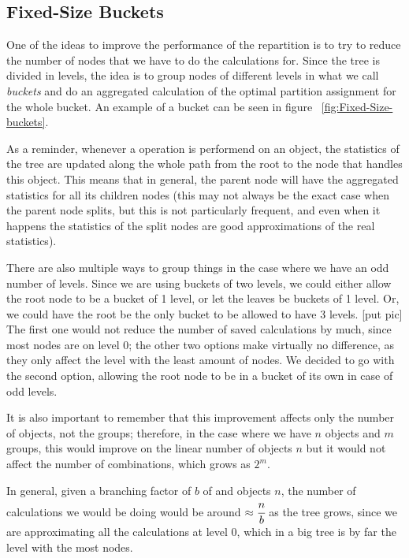 \subsection{Fixed-Size Buckets}\label{sec:Fixed-Size buckets}
One of the ideas to improve the performance of the repartition is to try to reduce the number of nodes that we have to do the calculations for. Since the tree is divided in levels, the idea is to group nodes of different levels in what we call \emph{buckets} and do an aggregated calculation of the optimal partition assignment for the whole bucket. An example of a bucket can be seen in figure ~\ref{fig:Fixed-Size-buckets}.

As a reminder, whenever a operation is performend on an object, the statistics of the tree are updated along the whole path from the root to the node that handles this object. This means that in general, the parent node will have the aggregated statistics for all its children nodes (this may not always be the exact case when the parent node splits, but this is not particularly frequent, and even when it happens the statistics of the split nodes are good approximations of the real statistics).

There are also multiple ways to group things in the case where we have an odd number of levels. Since we are using buckets of two levels, we could either allow the root node to be a bucket of 1 level, or let the leaves be buckets of 1 level. Or, we could have the root be the only bucket to be allowed to have 3 levels. [put pic] The first one would not reduce the number of saved calculations by much, since most nodes are on level 0; the other two options make virtually no difference, as they only affect the level with the least amount of nodes. We decided to go with the second option, allowing the root node to be in a bucket of its own in case of odd levels.

It is also important to remember that this improvement affects only the number of objects, not the groups; therefore, in the case where we have $n$ objects and $m$ groups, this would improve on the linear number of objects $n$ but it would not affect the number of combinations, which grows as $2^m$.

In general, given a branching factor of $b$ of and objects $n$, the number of calculations we would be doing would be around $\approx\cfrac{n}{b}$ as the tree grows, since we are approximating all the calculations at level 0, which in a big tree is by far the level with the most nodes.

